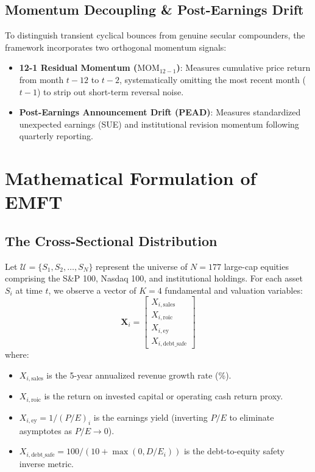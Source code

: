 \documentclass[11pt]{article}
\begin{document}
\subsection{Momentum Decoupling \& Post-Earnings Drift}

To distinguish transient cyclical bounces from genuine secular compounders, the framework incorporates two orthogonal momentum signals:
\begin{itemize}
    \item \textbf{12-1 Residual Momentum ($\text{MOM}_{12-1}$)}: Measures cumulative price return from month $t-12$ to $t-2$, systematically omitting the most recent month ($t-1$) to strip out short-term reversal noise.
    \item \textbf{Post-Earnings Announcement Drift (PEAD)}: Measures standardized unexpected earnings (SUE) and institutional revision momentum following quarterly reporting.
\end{itemize}

\section{Mathematical Formulation of EMFT}

\subsection{The Cross-Sectional Distribution}

Let $\mathcal{U} = \{S_1, S_2, \dots, S_N\}$ represent the universe of $N=177$ large-cap equities comprising the S\&P 100, Nasdaq 100, and institutional holdings. For each asset $S_i$ at time $t$, we observe a vector of $K=4$ fundamental and valuation variables:
\begin{equation}
    \bm{X}_i = \begin{bmatrix} X_{i, \text{sales}} \\ X_{i, \text{roic}} \\ X_{i, \text{ey}} \\ X_{i, \text{debt\_safe}} \end{bmatrix}
\end{equation}
where:
\begin{itemize}
    \item $X_{i, \text{sales}}$ is the 5-year annualized revenue growth rate (\%).
    \item $X_{i, \text{roic}}$ is the return on invested capital or operating cash return proxy.
    \item $X_{i, \text{ey}} = 1 / (P/E)_i$ is the earnings yield (inverting $P/E$ to eliminate asymptotes as $P/E \to 0$).
    \item $X_{i, \text{debt\_safe}} = 100 / (10 + \max(0, D/E_i))$ is the debt-to-equity safety inverse metric.
\end{itemize}
\end{document}
